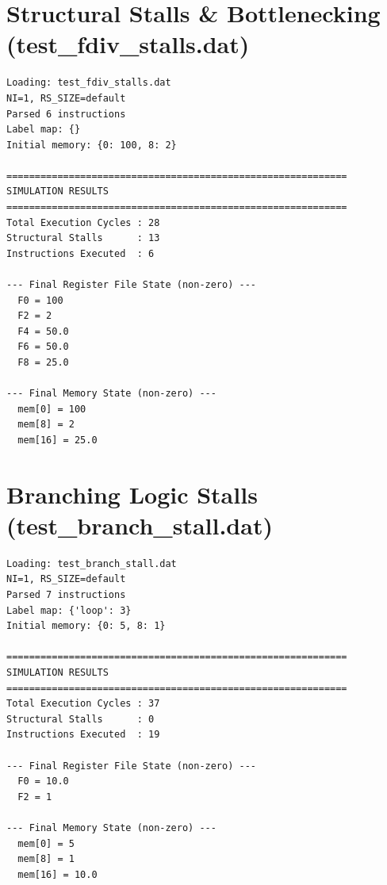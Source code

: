 \documentclass{article}
\begin{document}
\section{Structural Stalls \& Bottlenecking (test\_fdiv\_stalls.dat)}
\begin{verbatim}
Loading: test_fdiv_stalls.dat
NI=1, RS_SIZE=default
Parsed 6 instructions
Label map: {}
Initial memory: {0: 100, 8: 2}

============================================================
SIMULATION RESULTS
============================================================
Total Execution Cycles : 28
Structural Stalls      : 13
Instructions Executed  : 6

--- Final Register File State (non-zero) ---
  F0 = 100
  F2 = 2
  F4 = 50.0
  F6 = 50.0
  F8 = 25.0

--- Final Memory State (non-zero) ---
  mem[0] = 100
  mem[8] = 2
  mem[16] = 25.0
\end{verbatim}

\section{Branching Logic Stalls (test\_branch\_stall.dat)}
\begin{verbatim}
Loading: test_branch_stall.dat
NI=1, RS_SIZE=default
Parsed 7 instructions
Label map: {'loop': 3}
Initial memory: {0: 5, 8: 1}

============================================================
SIMULATION RESULTS
============================================================
Total Execution Cycles : 37
Structural Stalls      : 0
Instructions Executed  : 19

--- Final Register File State (non-zero) ---
  F0 = 10.0
  F2 = 1

--- Final Memory State (non-zero) ---
  mem[0] = 5
  mem[8] = 1
  mem[16] = 10.0
\end{verbatim}
\end{document}
